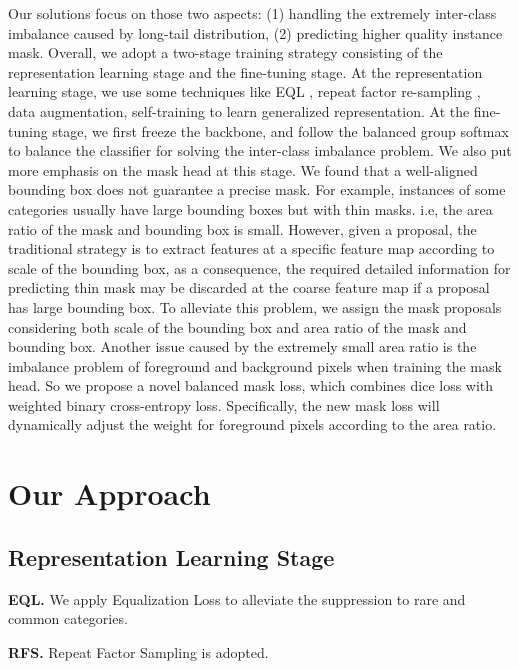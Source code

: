 \documentclass[runningheads]{llncs}
\begin{document}
 Our solutions focus on those two aspects: (1) handling the extremely inter-class imbalance caused by long-tail distribution, (2) predicting higher quality instance mask. Overall, we adopt a two-stage training strategy consisting of the representation learning stage and the fine-tuning stage. At the representation learning stage, we use some techniques like EQL \cite{tan2020equalization}, repeat factor re-sampling \cite{gupta2019lvis}, data augmentation, self-training to learn generalized representation. At the fine-tuning stage, we first freeze the backbone, and follow the balanced group softmax to balance the classifier for solving the inter-class imbalance problem. We also put more emphasis on the mask head at this stage. We found that a well-aligned bounding box does not guarantee a precise mask. For example, instances of some categories usually have large bounding boxes but with thin masks. i.e, the area ratio of the mask and bounding box is small. However, given a proposal, the traditional strategy is to extract features at a specific feature map according to scale of the bounding box, as a consequence, the required detailed information for predicting thin mask may be discarded at the coarse feature map if a proposal has large bounding box. To alleviate this problem, we assign the mask proposals considering both scale of the bounding box and area ratio of the mask and bounding box. Another issue caused by the extremely small area ratio is the imbalance problem of foreground and background pixels when training the mask head. So we propose a novel balanced mask loss, which combines dice loss \cite{milletari2016v} with weighted binary cross-entropy loss. Specifically, the new mask loss will dynamically adjust the weight for foreground pixels according to the area ratio.
 
 \section{Our Approach}
 
 \subsection{Representation Learning Stage}
 
 \textbf{EQL.} We apply Equalization Loss \cite{tan2020equalization} to alleviate the suppression to rare and common categories.
 
 \noindent \textbf{RFS.} Repeat Factor Sampling \cite{gupta2019lvis} is adopted.
 
\end{document}
